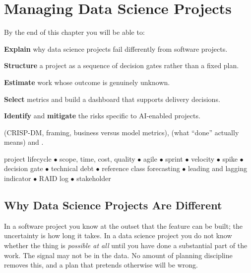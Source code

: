 \chapter{Managing Data Science Projects}\label{ch:projectmgmt}

\begin{outcomes}
By the end of this chapter you will be able to:
\begin{tight}
  \item \textbf{Explain} why data science projects fail differently from software projects.
  \item \textbf{Structure} a project as a sequence of decision gates rather than a fixed plan.
  \item \textbf{Estimate} work whose outcome is genuinely unknown.
  \item \textbf{Select} metrics and build a dashboard that supports delivery decisions.
  \item \textbf{Identify} and \textbf{mitigate} the risks specific to AI-enabled projects.
\end{tight}
\end{outcomes}

\begin{prereq}
 (CRISP-DM, framing, business versus model metrics),
 (what ``done'' actually means) and .
\end{prereq}

\begin{keyterms}
project lifecycle $\bullet$ scope, time, cost, quality $\bullet$ agile $\bullet$
sprint $\bullet$ velocity $\bullet$ spike $\bullet$ decision gate $\bullet$
technical debt $\bullet$ reference class forecasting $\bullet$ leading and lagging
indicator $\bullet$ RAID log $\bullet$ stakeholder
\end{keyterms}

\section{Why Data Science Projects Are Different}

\begin{alertbox}
In a software project you know at the outset that the feature can be built; the
uncertainty is how long it takes. In a data science project you do not know whether
the thing is \emph{possible at all} until you have done a substantial part of the
work. The signal may not be in the data. No amount of planning discipline removes
this, and a plan that pretends otherwise will be wrong.
\end{alertbox}


